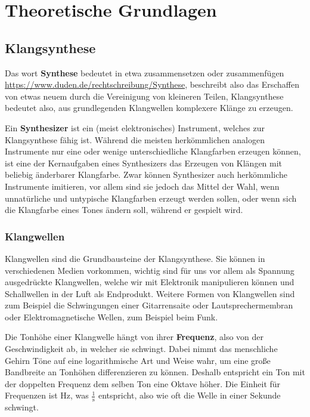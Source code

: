 \chapter{Theoretische Grundlagen}

\section{Klangsynthese}
\label{sec:org7604062}
Das wort \textbf{Synthese} bedeutet in etwa zusammensetzen oder zusammenfügen \url{https://www.duden.de/rechtschreibung/Synthese}, beschreibt also das Erschaffen von etwas neuem durch die Vereinigung von kleineren Teilen, Klangsynthese bedeutet also, aus grundlegenden Klangwellen komplexere Klänge zu erzeugen.

Ein \textbf{Synthesizer} ist ein (meist elektronisches) Instrument, welches zur Klangsynthese fähig ist. Während die meisten herkömmlichen analogen Instrumente nur eine oder wenige unterschiedliche Klangfarben erzeugen können, ist eine der Kernaufgaben eines Synthesizers das Erzeugen von Klängen mit beliebig änderbarer Klangfarbe. Zwar können Synthesizer auch herkömmliche Instrumente imitieren, vor allem sind sie jedoch das Mittel der Wahl, wenn unnatürliche und untypische Klangfarben erzeugt werden sollen, oder wenn sich die Klangfarbe eines Tones ändern soll, während er gespielt wird.

\subsection{Klangwellen}
\label{sec:orgbe48a28}
Klangwellen sind die Grundbausteine der Klangsynthese. Sie können in verschiedenen Medien vorkommen, wichtig sind für uns vor allem als Spannung ausgedrückte Klangwellen, welche wir mit Elektronik manipulieren können und Schallwellen in der Luft als Endprodukt. Weitere Formen von Klangwellen sind zum Beispiel die Schwingungen einer Gitarrensaite oder Lautsprechermembran oder Elektromagnetische Wellen, zum Beispiel beim Funk.

Die Tonhöhe einer Klangwelle hängt von ihrer \textbf{Frequenz}, also von der Geschwindigkeit ab, in welcher sie schwingt. Dabei nimmt das menschliche Gehirn Töne auf eine logarithmische Art und Weise wahr, um eine große Bandbreite an Tonhöhen differenzieren zu können. Deshalb entspricht ein Ton mit der doppelten Frequenz dem selben Ton eine Oktave höher. Die Einheit für Frequenzen ist \si{\hertz}, was \(\frac{1}{\si{\second}}\) entspricht, also wie oft die Welle in einer Sekunde schwingt.

